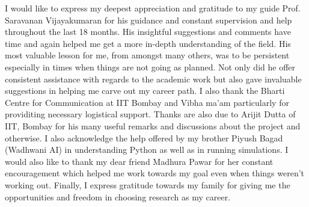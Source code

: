 \acknowledgments

I would like to express my deepest appreciation and gratitude to my guide Prof.
Saravanan Vijayakumaran for his guidance and constant supervision and help throughout the last 18 months. 
His insightful suggestions and comments have time and again helped me get a more in-depth understanding of the field.
His most valuable lesson for me, from amongst many others, was to be persistent especially in times when things are not going as planned. 
Not only did he offer consistent assistance with regards to the academic work but also gave invaluable suggestions in helping me carve out my career path. 
I also thank the Bharti Centre for Communication at IIT Bombay and Vibha ma'am particularly for providiting necessary logistical support.
Thanks are also due to Arijit Dutta of IIT, Bombay for his many useful remarks and discussions about the project and otherwise. 
I also acknowledge the help offered by my brother Piyush Bagad (Wadhwani AI) in understanding Python as well as in running simulations. 
I would also like to thank my dear friend Madhura Pawar for her constant encouragement
which helped me work towards my goal even when things weren't working out.
Finally, I express gratitude towards my family for giving me the opportunities and freedom in choosing research as my career.





\signature{\today}


